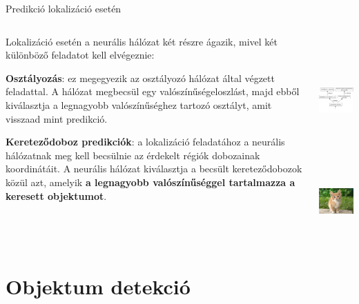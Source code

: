 \documentclass[english, aspectratio=169]{beamer}
\begin{document}
\begin{frame}{Predikció lokalizáció esetén}
\begin{columns}
\begin{column}{.6\textwidth}
Lokalizáció esetén a neurális hálózat két részre ágazik, mivel két különböző feladatot kell elvégeznie:\par\smallskip
\textbf{Osztályozás}: ez megegyezik az osztályozó hálózat által végzett feladattal. A hálózat megbecsül egy valószínűségeloszlást, majd ebből kiválasztja a legnagyobb valószínűséghez tartozó osztályt, amit visszaad mint predikció.\par\smallskip
\textbf{Kereteződoboz predikciók}: a lokalizáció feladatához a neurális hálózatnak meg kell becsülnie az érdekelt régiók dobozainak koordinátáit. A neurális hálózat kiválasztja a becsült kereteződobozok közül azt, amelyik \textbf{a legnagyobb valószínűséggel tartalmazza a keresett objektumot}. 
\end{column}
\begin{column}{.4\textwidth}
\begin{center}
\includegraphics[height=5cm, width=5.5cm, keepaspectratio]{graphs/od_2.png}\\
\vspace{-0.7cm}
\includegraphics[height=2.5cm, width=2.5cm, keepaspectratio]{images/od_1.png}
\end{center}
\end{column}
\end{columns}
\end{frame}

\section{Objektum detekció}
\end{document}
